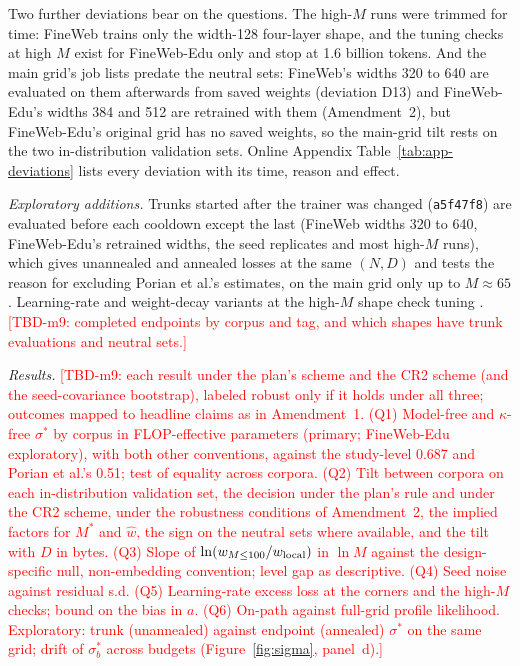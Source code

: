 Two further deviations bear on the questions. The high-$M$ runs were trimmed for time: FineWeb trains only the width-128
four-layer shape, and the tuning checks at high $M$ exist for FineWeb-Edu only and stop at 1.6 billion tokens. And the
main grid's job lists predate the neutral sets: FineWeb's widths 320 to 640 are evaluated on them afterwards from saved
weights (deviation D13) and FineWeb-Edu's widths 384 and 512 are retrained with them (Amendment~2), but FineWeb-Edu's
original grid has no saved weights, so the main-grid tilt rests on the two in-distribution validation sets. Online Appendix Table~\ref{tab:app-deviations} lists
every deviation with its time, reason and effect.

\textit{Exploratory additions.} Trunks started after the trainer was changed (\texttt{a5f47f8}) are evaluated before
each cooldown except the last (FineWeb widths 320 to 640, FineWeb-Edu's retrained widths, the seed replicates and most
high-$M$ runs), which gives unannealed and annealed losses at the same $(N,D)$ and tests the reason for excluding Porian
et al.'s estimates, on the main grid only up to $M\approx65$. Learning-rate and weight-decay variants at the high-$M$ shape
check tuning \citep{bergsma2025power,lourie2026small}.
\textcolor{red}{[TBD-m9: completed endpoints by corpus and tag, and which shapes have trunk evaluations and neutral
sets.]}

\textit{Results.} \textcolor{red}{[TBD-m9: each result under the plan's scheme and the CR2 scheme (and the
seed-covariance bootstrap), labeled robust only if it holds under all three; outcomes mapped to headline claims as in
Amendment~1. (Q1) Model-free and $\kappa$-free $\sigma^*$ by corpus in FLOP-effective parameters (primary;
FineWeb-Edu exploratory), with both other conventions, against the study-level 0.687 and Porian et al.'s 0.51; test of
equality across corpora. (Q2) Tilt between corpora on each in-distribution validation set, the decision under the
plan's rule and under the CR2 scheme, under the robustness conditions of Amendment~2, the implied factors for $M^*$ and
$\hat w$, the sign on the neutral sets where available, and the tilt with $D$ in bytes. (Q3) Slope of
$\ln(w_{M\le100}/w_{\rm local})$ in $\ln M$ against the design-specific null, non-embedding convention; level gap as
descriptive. (Q4) Seed noise against residual s.d. (Q5) Learning-rate excess loss at the corners and the high-$M$ checks;
bound on the bias in $a$. (Q6) On-path against full-grid profile likelihood. Exploratory: trunk (unannealed) against
endpoint (annealed) $\sigma^*$ on the same grid; drift of $\sigma^*_b$ across budgets (Figure~\ref{fig:sigma},
panel~d).]}
